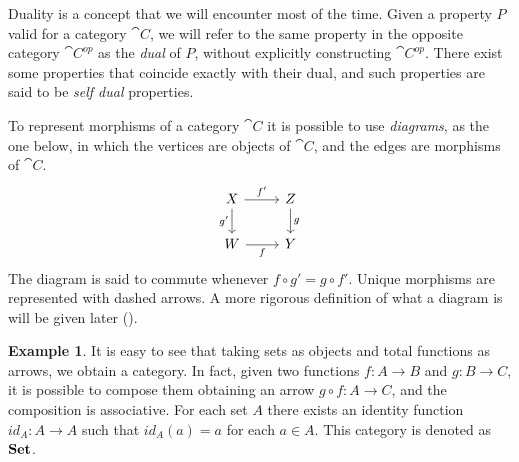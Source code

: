 \documentclass[a4paper, twoside,openright]{report}
\theoremstyle{plain}
\theoremstyle{definition}
\newtheorem{example}[theorem]{Example}
\begin{document}
Duality is a concept that we will encounter most of the time. Given a property $P$ valid for a category $\cat C$, we will refer to the same property in the opposite category $\cat C^{op}$ as the \emph{dual} of $P$, without explicitly constructing $\cat C^{op}$. There exist some properties that coincide exactly with their dual, and such properties are said to be \emph{self dual} properties.


To represent morphisms of a category $\cat{C}$ it is possible to use \emph{diagrams}, as the one below, in which the vertices are objects of $\cat{C}$, and the edges are morphisms of $\cat{C}$.
    \[
    \begin{tikzcd}
        X \arrow[d, "g'" swap] \arrow[r, "f'"] & Z \arrow[d, "g"] \\
        W \arrow[r, "f" swap] & Y        
    \end{tikzcd}
    \]
The diagram is said to commute whenever  $f \circ g' = g \circ f'$. Unique morphisms are represented with dashed arrows.
A more rigorous definition of what a diagram is will be given later ().

\begin{example}
    It is easy to see that taking sets as objects and total functions as arrows, we obtain a category. In fact, given two functions $f: A \rightarrow B$ and $g: B \rightarrow C$, it is possible to compose them obtaining an arrow $g \circ f : A \rightarrow C$, and the composition is associative. For each set $A$ there exists an identity function $id_A: A \rightarrow A$ such that $id_A(a) = a$ for each $a\in A$.
    This category is denoted as $\mathbf{Set}$.
\end{example}
\end{document}
